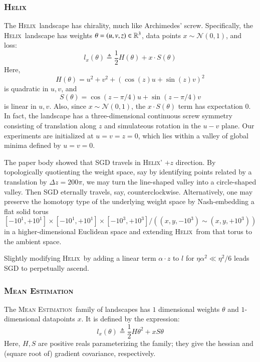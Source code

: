 \documentclass[anon,12pt]{colt2021} %
\newcommand{\Nn}{\mathcal{N}}   \newcommand{\NN}{\mathbb{N}}
\newcommand{\Helix}{\textsc{Helix}}
\newcommand{\MeanEstimation}{\textsc{Mean Estimation}}
\begin{document}
        \subsubsection{\Helix}
            The \Helix\ landscape has chirality, much like Archimedes'
            screw.
            Specifically, the \Helix\ landscape has
            weights     $\theta = (u,v,z) \in \mathbb{R}^3$,
            data points $x \sim \Nn(0, 1)$,
            and loss:
            $$
                l_x(\theta)
                \triangleq
                \frac{1}{2} H(\theta) + x \cdot S(\theta)
            $$
            Here,
            $$
                H(\theta) = u^2 + v^2 + (\cos(z) u + \sin(z) v)^2
            $$
            is quadratic in $u, v$, and
            $$
                S(\theta) = \cos(z-\pi/4) u + \sin(z-\pi/4) v
            $$
            is linear in $u, v$.
            Also, since $x \sim \Nn(0,1)$, the $x \cdot S(\theta)$ term has
            expectation $0$.
            In fact, the landscape has a three-dimensional continuous screw
            symmetry consisting of translation along $z$ and simulateous
            rotation in the $u-v$ plane.  Our experiments are initialized at
            $u=v=z=0$, which lies within a valley of global minima defined by
            $u=v=0$.  

            The paper body showed that SGD travels in \Helix' $+z$
            direction.  By topologically quotienting the weight space, say by
            identifying points related by a translation by $\Delta z = 200\pi$,
            we may turn the line-shaped valley into a circle-shaped valley.
            Then SGD eternally travels, say, counterclockwise.  Alternatively,
            one may preserve the homotopy type of the underlying weight space
            by Nash-embedding a flat solid torus
            $$
                [-10^1,+10^1]\times[-10^1,+10^1]\times[-10^3,+10^3]/((x,y,-10^3)\sim(x,y,+10^3))
            $$
            in a higher-dimensional Euclidean space and extending \Helix\ from
            that torus to the ambient space.

            Slightly modifying \Helix\ by adding a linear term $\alpha\cdot z$
            to $l$ for $\eta\alpha^2 \ll \eta^2/6$ leads SGD to perpetually ascend.
           
        \subsubsection{\MeanEstimation}
            The \MeanEstimation\, family of landscapes has $1$ dimensional
            weights $\theta$ and $1$-dimensional datapoints $x$.  It is defined
            by the expression:
            $$
                l_x(\theta)
                \triangleq
                \frac{1}{2} H \theta^2 + x S \theta
            $$
            Here, $H, S$ are positive reals parameterizing the family; they
            give the hessian and (square root of) gradient covariance,
            respectively.
\end{document}
